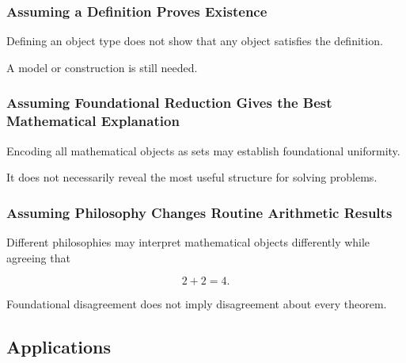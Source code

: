 \subsubsection{Assuming a Definition Proves Existence}

Defining an object type does not show that any object satisfies the
definition.

A model or construction is still needed.

\subsubsection{Assuming Foundational Reduction Gives the Best Mathematical Explanation}

Encoding all mathematical objects as sets may establish foundational
uniformity.

It does not necessarily reveal the most useful structure for solving
problems.

\subsubsection{Assuming Philosophy Changes Routine Arithmetic Results}

Different philosophies may interpret mathematical objects differently while
agreeing that

\[
\boxed{
2+2=4.
}
\]

Foundational disagreement does not imply disagreement about every theorem.

\subsection{Applications}
\label{subsec:philosophy-foundations-applications}

